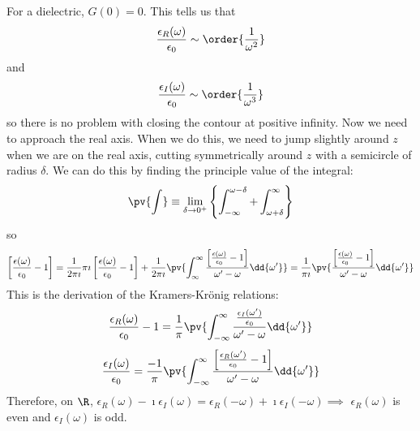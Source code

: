 \documentclass[a4paper,twoside,master.tex]{subfiles}
\begin{document}
For a dielectric, $ G(0) = 0 $. This tells us that
\begin{equation}
    \frac{\epsilon_R(\omega)}{\epsilon_0} \sim \order{\frac{1}{\omega^2}}
\end{equation}
and
\begin{equation}
    \frac{\epsilon_I(\omega)}{\epsilon_0} \sim \order{\frac{1}{\omega^3}}
\end{equation}
so there is no problem with closing the contour at positive infinity. Now we need to approach the real axis. When we do this, we need to jump slightly around $ z $ when we are on the real axis, cutting symmetrically around $ z $ with a semicircle of radius $ \delta $. We can do this by finding the principle value of the integral:
\begin{equation}
    \pv{\int} \equiv \lim_{\delta \to 0^+} \left\{ \int_{- \infty}^{\omega - \delta} + \int_{\omega + \delta}^{\infty} \right\}
\end{equation}
so
\begin{equation}
    \left[ \frac{\epsilon(\omega)}{\epsilon_0} - 1 \right] = \frac{1}{2 \pi \imath} \pi \imath \left[ \frac{\epsilon(\omega)}{\epsilon_0} - 1 \right] + \frac{1}{2 \pi \imath} \pv{\int_{\infty}^{\infty} \frac{\left[ \frac{\epsilon(\omega)}{\epsilon_0} - 1 \right]}{\omega' - \omega} \dd{\omega'}} = \frac{1}{\pi \imath} \pv{\frac{\left[ \frac{\epsilon(\omega)}{\epsilon_0} - 1 \right]}{\omega' - \omega} \dd{\omega'}}
\end{equation}
This is the derivation of the Kramers-Kr\"onig relations:
\begin{equation}
    \frac{\epsilon_R(\omega)}{\epsilon_0} - 1 = \frac{1}{\pi} \pv{\int_{- \infty}^{\infty} \frac{\frac{\epsilon_I(\omega')}{\epsilon_0}}{\omega' - \omega} \dd{\omega'}}
\end{equation}
\begin{equation}
    \frac{\epsilon_I(\omega)}{\epsilon_0} = \frac{-1}{\pi} \pv{\int_{- \infty}^{\infty} \frac{\left[\frac{\epsilon_R(\omega')}{\epsilon_0}-1\right]}{\omega' - \omega} \dd{\omega'}}
\end{equation}
Therefore, on $ \R $, $ \epsilon_R(\omega) - \imath \epsilon_I(\omega) = \epsilon_R(- \omega) + \imath \epsilon_I(- \omega) \implies $ $ \epsilon_R(\omega) $ is even and $ \epsilon_I(\omega) $ is odd.
\end{document}
